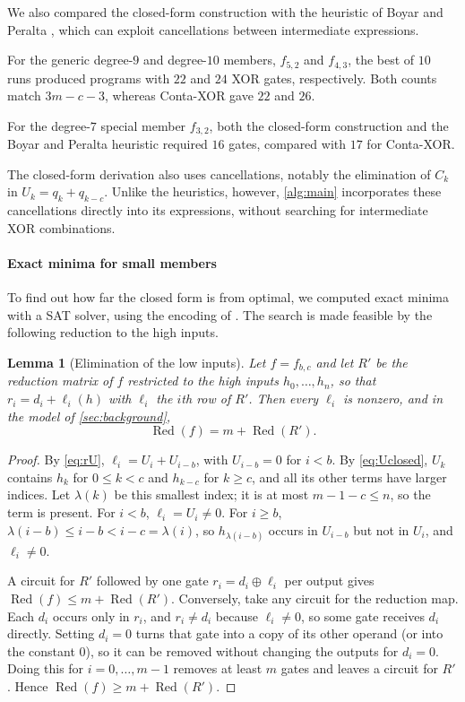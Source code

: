 \documentclass{ieeeaccess}
\theoremstyle{plain}
\newtheorem{lemma}[theorem]{Lemma}
\theoremstyle{definition}
\newcommand{\Red}{\operatorname{Red}}
\newcommand{\xor}{\oplus}
\begin{document}
We also compared the closed-form construction with the heuristic of Boyar and
Peralta \cite{BoyarPeralta2010}, which can exploit cancellations between
intermediate expressions.

For the generic degree-$9$ and degree-$10$ members, $f_{5,2}$ and $f_{4,3}$, the
best of $10$ runs produced programs with $22$ and $24$ XOR gates, respectively.
Both counts match $3m-c-3$, whereas Conta-XOR gave $22$ and $26$.

For the degree-$7$ special member $f_{3,2}$, both the closed-form construction
and the Boyar and Peralta heuristic required $16$ gates, compared with $17$ for
Conta-XOR.

The closed-form derivation also uses cancellations, notably the elimination of
$C_k$ in $U_k=q_k+q_{k-c}$. Unlike the heuristics, however, \cref{alg:main}
incorporates these cancellations directly into its expressions, without
searching for intermediate XOR combinations.

\paragraph*{Exact minima for small members}
To find out how far the closed form is from optimal, we computed exact minima
with a SAT solver, using the encoding of \cite{Stoffelen2016}. The search is made
feasible by the following reduction to the high inputs.

\begin{lemma}[Elimination of the low inputs]\label{lem:lowinputs}
Let $f=f_{b,c}$ and let $R'$ be the reduction matrix of $f$ restricted to the
high inputs $h_0,\dots,h_n$, so that $r_i=d_i+\ell_i(h)$ with $\ell_i$ the
$i$th row of $R'$. Then every $\ell_i$ is nonzero, and in the model of
\cref{sec:background},
\[
  \Red(f)=m+\Red(R').
\]
\end{lemma}

\begin{proof}
By \eqref{eq:rU}, $\ell_i=U_i+U_{i-b}$, with $U_{i-b}=0$ for $i<b$. By
\eqref{eq:Uclosed}, $U_k$ contains $h_k$ for $0\le k<c$ and $h_{k-c}$ for
$k\ge c$, and all its other terms have larger indices. Let $\lambda(k)$ be this
smallest index; it is at most $m-1-c\le n$, so the term is present. For $i<b$,
$\ell_i=U_i\ne0$. For $i\ge b$, $\lambda(i-b)\le i-b<i-c=\lambda(i)$, so
$h_{\lambda(i-b)}$ occurs in $U_{i-b}$ but not in $U_i$, and $\ell_i\ne0$.

A circuit for $R'$ followed by one gate $r_i=d_i\xor\ell_i$ per output gives
$\Red(f)\le m+\Red(R')$. Conversely, take any circuit for the reduction map.
Each $d_i$ occurs only in $r_i$, and $r_i\ne d_i$ because $\ell_i\ne0$, so some
gate receives $d_i$ directly. Setting $d_i=0$ turns that gate into a copy of its
other operand (or into the constant $0$), so it can be removed without changing
the outputs for $d_i=0$. Doing this for $i=0,\dots,m-1$ removes at least $m$
gates and leaves a circuit for $R'$. Hence $\Red(f)\ge m+\Red(R')$.
\end{proof}
\end{document}
